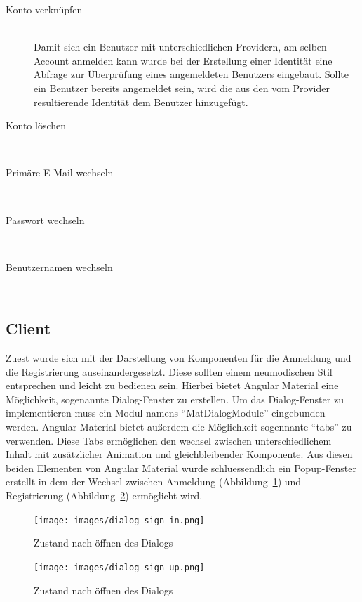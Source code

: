 \documentclass[paper=a4,fontsize=12pt,parskip=half]{scrartcl}
\begin{document}
	\begin{description}
		\item[Konto verknüpfen]\hfill\\
		Damit sich ein Benutzer mit unterschiedlichen Providern, am selben Account anmelden kann wurde bei der Erstellung einer Identität eine Abfrage zur Überprüfung eines angemeldeten Benutzers eingebaut. Sollte ein Benutzer bereits angemeldet sein, wird die aus den vom Provider resultierende Identität dem Benutzer hinzugefügt.
		\item[Konto löschen]\hfill\\
		\item[Primäre E-Mail wechseln]\hfill\\
		\item[Passwort wechseln]\hfill\\
		\item[Benutzernamen wechseln]\hfill\\
	\end{description}

	\subsection{Client}
	\label{sec: client}
	Zuest wurde sich mit der Darstellung von Komponenten für die Anmeldung und die Registrierung auseinandergesetzt. Diese sollten einem neumodischen Stil entsprechen und leicht zu bedienen sein. Hierbei bietet Angular Material eine Möglichkeit, sogenannte Dialog-Fenster zu erstellen. Um das Dialog-Fenster zu implementieren muss ein Modul namens \enquote{MatDialogModule} eingebunden werden. Angular Material bietet außerdem die Möglichkeit sogennante \enquote{tabs} zu verwenden. Diese Tabs ermöglichen den wechsel zwischen unterschiedlichem Inhalt mit zusätzlicher Animation und gleichbleibender Komponente. Aus diesen beiden Elementen von Angular Material wurde schluessendlich ein Popup-Fenster erstellt in dem der Wechsel zwischen Anmeldung (Abbildung~\ref{fig:dialog_sign_in}) und Registrierung (Abbildung~\ref{fig:dialog_sign_up}) ermöglicht wird.

	\begin{figure}
		\texttt{[image: images/dialog-sign-in.png]}
		\caption{Zustand nach öffnen des Dialogs}
		\label{fig:dialog_sign_in}
	\end{figure}

	\begin{figure}
		\texttt{[image: images/dialog-sign-up.png]}
		\caption{Zustand nach öffnen des Dialogs}
		\label{fig:dialog_sign_up}
	\end{figure}
\end{document}
